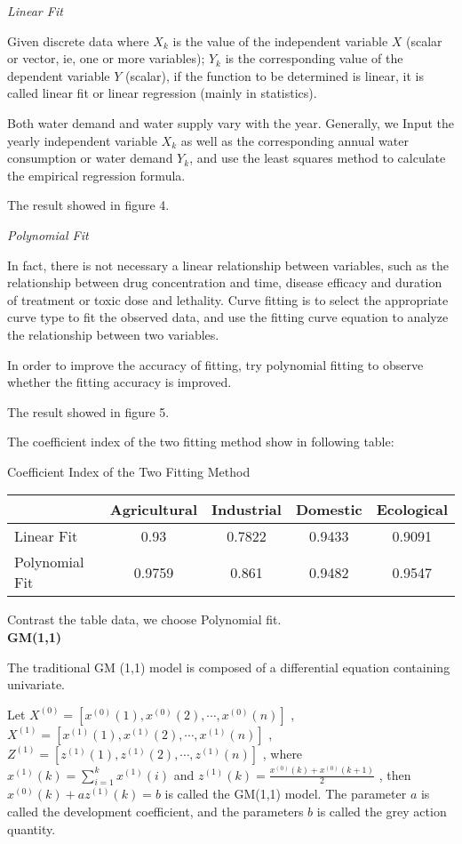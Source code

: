 \documentclass{mcmthesis}
\begin{document}
\emph{Linear Fit}
\par Given discrete data where $X_k$ is the value of the independent variable $X$ (scalar or vector, ie, one or more variables); $Y_k$ is the corresponding value of the dependent variable $Y$ (scalar), if the function to be determined is linear, it is called linear fit or linear regression (mainly in statistics).
\par Both water demand and water supply vary with the year. Generally, we Input the yearly independent variable $X_k$ as well as the corresponding annual water consumption or water demand $Y_k$, and use the least squares method to calculate the empirical regression formula.
\par The result showed in figure 4.

\emph{Polynomial Fit}
\par In fact, there is not necessary a linear relationship between variables, such as the relationship between drug concentration and time, disease efficacy and duration of treatment or toxic dose and lethality. Curve fitting is to select the appropriate curve type to fit the observed data, and use the fitting curve equation to analyze the relationship between two variables. 
\par In order to improve the accuracy of fitting, try polynomial fitting to observe whether the fitting accuracy is improved.
\par The result showed in figure 5.

\par The coefficient index of the two fitting method show in following table:

\begin{center}
	Coefficient Index of the Two Fitting Method\\
\begin{tabular}{lcccc}
\toprule 
 & Agricultural & Industrial & Domestic & Ecological \\
\midrule
Linear Fit & 0.93 & 0.7822 & 0.9433 & 0.9091 \\
Polynomial Fit & 0.9759 & 0.861 & 0.9482 & 0.9547\\
\bottomrule
\end{tabular}
\end{center}
\par Contrast the table data, we choose Polynomial fit.\\

\textbf{GM(1,1)}

\par The traditional GM (1,1) model is composed of a differential equation containing univariate.
\par Let $X^{(0)}=[x^{(0)}(1), x^{(0)}(2),\cdots ,x^{(0)}(n)]$ , $X^{(1)}=[x^{(1)}(1), x^{(1)}(2),\cdots ,x^{(1)}(n)]$ , $Z^{(1)}=[z^{(1)}(1), z^{(1)}(2),\cdots ,z^{(1)}(n)]$ , where $x^{(1)}(k) =  \sum\limits_{i=1}^k x^{(1)}(i)$ and $z^{(1)}(k) = \frac{x^{(0)}(k) + x^{(0)}(k+1)}{2}$ , then $x^{(0)}(k) + a z^{(1)}(k) = b$ is called the GM(1,1) model. The parameter $a$ is called the development coefficient, and the parameters $b$ is called the grey action quantity.
 
\end{document}
